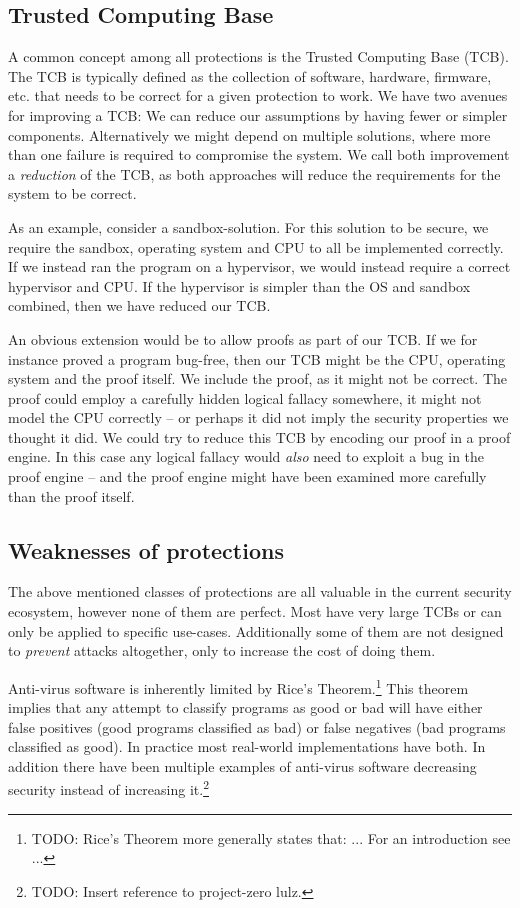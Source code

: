 \subsection{Trusted Computing Base}
A common concept among all protections is the Trusted Computing Base
  (TCB). The TCB is typically defined as the collection of software, hardware,
firmware, etc. that needs to be correct for a given protection to work. We have
two avenues for improving a TCB: We can reduce our assumptions by having fewer
or simpler components. Alternatively we might depend on multiple solutions,
where more than one failure is required to compromise the system. We call both
improvement a \emph{reduction} of the TCB, as both approaches will reduce the
requirements for the system to be correct.

As an example, consider a sandbox-solution. For this solution to be secure, we
require the sandbox, operating system and CPU to all be implemented
correctly. If we instead ran the program on a hypervisor, we would instead
require a correct hypervisor and CPU. If the hypervisor is simpler than the OS
and sandbox combined, then we have reduced our TCB.

An obvious extension would be to allow proofs as part of our TCB. If we for
instance proved a program bug-free, then our TCB might be the CPU, operating
system and the proof itself. We include the proof, as it might not be
correct. The proof could employ a carefully hidden logical fallacy somewhere, it
might not model the CPU correctly -- or perhaps it did not imply the security
properties we thought it did. We could try to reduce this TCB by encoding our
proof in a proof engine. In this case any logical fallacy would \emph{also} need
to exploit a bug in the proof engine -- and the proof engine might have been
examined more carefully than the proof itself.

\subsection{Weaknesses of protections}
The above mentioned classes of protections are all valuable in the current
security ecosystem, however none of them are perfect. Most have very large TCBs
or can only be applied to specific use-cases. Additionally some of them are not
designed to \emph{prevent} attacks altogether, only to increase the cost of
doing them.

Anti-virus software is inherently limited by Rice's Theorem.\footnote{TODO:
  Rice's Theorem more generally states that: ... For an introduction see ...}
This theorem implies that any attempt to classify programs as good or bad will
have either false positives (good programs classified as bad) or false negatives
(bad programs classified as good). In practice most real-world implementations
have both. In addition there have been multiple examples of anti-virus software
decreasing security instead of increasing it.\footnote{TODO: Insert reference to
  project-zero lulz.}

